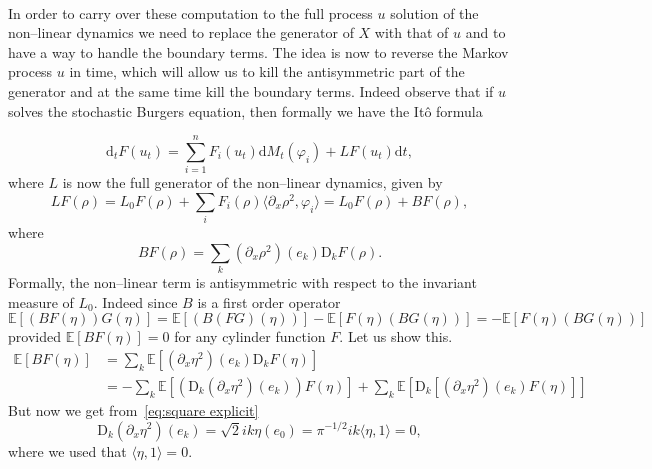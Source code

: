 \documentclass[a4paper,11pt]{article}
\newcommand{\mathD}{\mathrm{D}}
\newcommand{\mathd}{\mathrm{d}}
\begin{document}
\

In order to carry over these computation to the full process $u$ solution of
the non--linear dynamics we need to replace the generator of $X$ with that of
$u$ and to have a way to handle the boundary terms. The idea is now to reverse
the Markov process $u$ in time, which will allow us to kill the antisymmetric
part of the generator and at the same time kill the boundary terms. Indeed
observe that if $u$ solves the stochastic Burgers equation, then formally we
have the It{\^o} formula


\[ \mathd_t F (u_t) = \sum_{i = 1}^n F_i (u_t) \mathd M_t (\varphi_i) + L F
   (u_t) \mathd t, \]
where $L$ is now the full generator of the non--linear dynamics, given by
\[ L F (\rho) = L_0 F (\rho) + \sum_i F_i (\rho) \langle \partial_x \rho^2,
   \varphi_i \rangle = L_0 F (\rho) + B F (\rho), \]
where
\[ B F (\rho) = \sum_k (\partial_x \rho^2) (e_k) \mathD_k F (\rho) . \]
Formally, the non--linear term is antisymmetric with respect to the
invariant measure of $L_0$. Indeed since $B$ is a first order operator
\begin{equation}
\label{eq:antisymmetry of nonlinear} 
\mathbb{E} [(B F (\eta)) G (\eta)] =\mathbb{E} [(B (F G) (\eta))]
   -\mathbb{E} [F (\eta) (B G (\eta))] =  -\mathbb{E} [F (\eta) (B G (\eta))]
\end{equation}
provided $\mathbb{E} [B F (\eta)]=0$ for any cylinder function $F$. Let us show this. 
\begin{equation*}
\begin{aligned}
\mathbb{E} [B F (\eta)] & = \sum_k \mathbb{E} [(\partial_x \eta^2) (e_k)
   \mathD_k F (\eta)]\\
   &  = - \sum_k \mathbb{E} [(\mathD_k (\partial_x \eta^2) (e_k)) F (\eta)] +
   \sum_k \mathbb{E} [\mathD_k [(\partial_x \eta^2) (e_k) F (\eta)]]
\end{aligned}
\end{equation*}
But now we get from~\eqref{eq:square explicit}
\begin{equation*}
\mathD_k (\partial_x \eta^2) (e_k) = \sqrt{2} i k \eta (e_0) = \pi^{-1/2} i k \langle \eta ,1 \rangle = 0,
\end{equation*}
where we used that $\langle \eta, 1 \rangle = 0$. %
\end{document}
